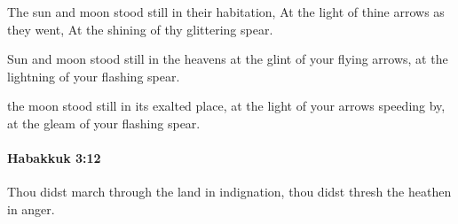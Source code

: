 			\begin{versebox}
					\item[BHS] 
					\item[LXX] 
					\item[ASV] The sun and moon stood still in their habitation, At the light of thine arrows as they went, At the shining of thy glittering spear.
					\item[NIV] Sun and moon stood still in the heavens at the glint of your flying arrows, at the lightning of your flashing spear.
					\item[NRSV] the moon stood still in its exalted place, at the light of your arrows speeding by, at the gleam of your flashing spear.
			\end{versebox}

		\paragraph{Habakkuk 3:12} %
			\label{HABAKKUK-3-12}

			Thou didst march through the land in indignation, thou didst thresh the heathen in anger.

